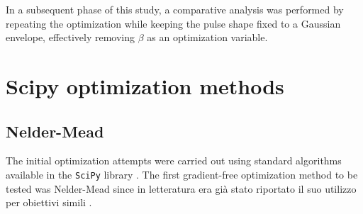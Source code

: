 In a subsequent phase of this study, a comparative analysis was performed by repeating the optimization while keeping the pulse shape fixed to a Gaussian envelope, effectively removing $\beta$ as an optimization variable. 


\section{Scipy optimization methods}\label{Sec:OptimizationMethods}

\subsection{Nelder-Mead}
The initial optimization attempts were carried out using standard algorithms available in the \texttt{SciPy} library \cite{SciPy-NMeth}.
The first gradient-free optimization method to be tested was Nelder-Mead since in letteratura era già stato riportato il suo utilizzo per obiettivi simili \cite{kelly_optimal_2014}.

